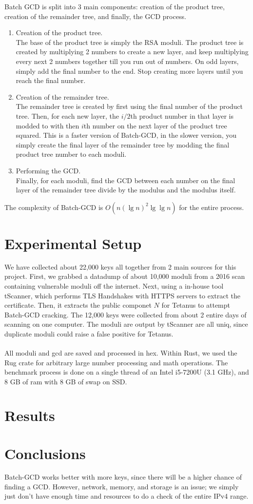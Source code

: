 \documentclass[10pt, letterpaper]{article}
\begin{document}
Batch GCD is split into 3 main components: creation of the product tree, creation of the remainder tree, and finally, the GCD process.

\begin{enumerate}
\item Creation of the product tree. \\
  The base of the product tree is simply the RSA moduli. The product tree is created by multiplying 2 numbers to create a new layer, and keep multiplying every next 2 numbers together till you run out of numbers. On odd layers, simply add the final number to the end. Stop creating more layers until you reach the final number.
\item Creation of the remainder tree. \\
  The remainder tree is created by first using the final number of the product tree. Then, for each new layer, the $i/2$th product number in that layer is modded to with then $i$th number on the next layer of the product tree squared. This is a faster version of Batch-GCD, in the slower version, you simply create the final layer of the remainder tree by modding the final product tree number to each moduli.
\item Performing the GCD. \\
  Finally, for each moduli, find the GCD between each number on the final layer of the remainder tree divide by the modulus and the modulus itself.
\end{enumerate}

The complexity of Batch-GCD is $O(n(\lg{n})^2 \lg{\lg{n}})$ for the entire process.

\section{Experimental Setup}
We have collected about 22,000 keys all together from 2 main sources for this project. First, we grabbed a datadump of about 10,000 moduli from a 2016 scan containing vulnerable moduli off the internet. Next, using a in-house tool tScanner, which performs TLS Handshakes with HTTPS servers to extract the certificate. Then, it extracts the public componet $N$ for Tetanus to attempt Batch-GCD cracking. The 12,000 keys were collected from about 2 entire days of scanning on one computer. The moduli are output by tScanner are all uniq, since duplicate moduli could raise a false positive for Tetanus.\\
\\
All moduli and gcd are saved and processed in hex. Within Rust, we used the Rug crate for arbitrary large number processing and math operations. The benchmark process is done on a single thread of an Intel i5-7200U (3.1 GHz), and 8 GB of ram with 8 GB of swap on SSD. 
\section{Results}

\section{Conclusions}
Batch-GCD works better with more keys, since there will be a higher chance of finding a GCD. However, network, memory, and storage is an issue; we simply just don't have enough time and resources to do a check of the entire IPv4 range.
\end{document}
